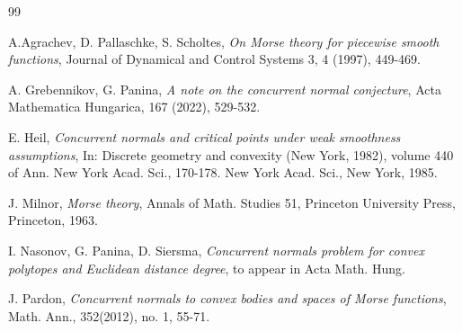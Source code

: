 \documentclass[12pt]{amsart}
\newtheorem*{main lemma}{The main lemma}
\begin{document}
\begin{thebibliography}{99}


 A.Agrachev, D. Pallaschke, S. Scholtes, \textit{On Morse theory for piecewise smooth functions}, Journal of Dynamical and Control Systems 3, 4 (1997), 449-469.


 A. Grebennikov, G. Panina,  {\em A note on the concurrent normal conjecture}, Acta Mathematica
Hungarica, 167 (2022), 529-532.

 E. Heil, {\em Concurrent normals and critical points under weak smoothness assumptions},
In: Discrete geometry and convexity (New York, 1982), volume 440 of Ann. New York
Acad. Sci., 170-178. New York Acad. Sci., New York, 1985.



  J. Milnor, {\em  Morse theory}, Annals of Math. Studies 51, Princeton University Press, Princeton, 1963.


 I. Nasonov, G. Panina, D. Siersma, \textit{Concurrent normals problem for convex polytopes and Euclidean distance degree},
to appear in Acta Math. Hung.


 J. Pardon, {\em Concurrent normals to convex bodies and spaces of Morse functions}, Math. Ann.,
352(2012), no. 1, 55-71.








\end{thebibliography}
\end{document}
